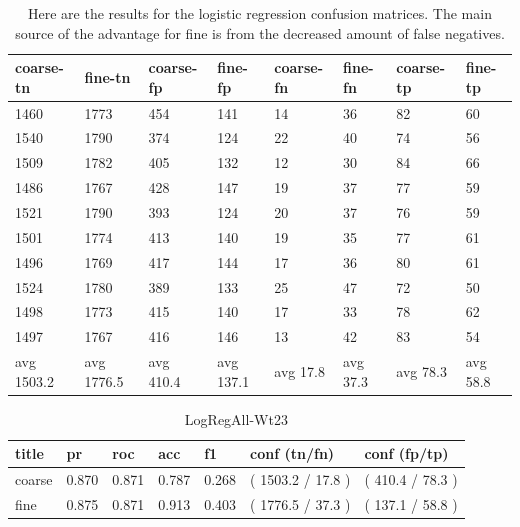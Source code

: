 \documentclass[ms]{nuthesis}
\begin{document}
\FloatBarrier
\begin{table}[H]
  \centering
  \begin{tabular}{|l||l||l||l||l||l||l||l|}\toprule
    coarse-tn & fine-tn & coarse-fp & fine-fp & coarse-fn & fine-fn & coarse-tp & fine-tp \\ \midrule
    1460 & 1773 & 454 & 141 & 14 & 36 & 82 & 60 \\
    1540 & 1790 & 374 & 124 & 22 & 40 & 74 & 56 \\
    1509 & 1782 & 405 & 132 & 12 & 30 & 84 & 66 \\
    1486 & 1767 & 428 & 147 & 19 & 37 & 77 & 59 \\
    1521 & 1790 & 393 & 124 & 20 & 37 & 76 & 59 \\
    1501 & 1774 & 413 & 140 & 19 & 35 & 77 & 61 \\
    1496 & 1769 & 417 & 144 & 17 & 36 & 80 & 61 \\
    1524 & 1780 & 389 & 133 & 25 & 47 & 72 & 50 \\
    1498 & 1773 & 415 & 140 & 17 & 33 & 78 & 62 \\
    1497 & 1767 & 416 & 146 & 13 & 42 & 83 & 54 \\
    avg 1503.2 & avg 1776.5 & avg 410.4 & avg 137.1 & avg 17.8 & avg 37.3 & avg 78.3 & avg 58.8 \\ \bottomrule
  \end{tabular}
  \caption{Here are the results for the logistic regression confusion matrices. The main source of the advantage
  for fine is from the decreased amount of false negatives.}
  \label{tab:logReg}
\end{table}
\FloatBarrier

\FloatBarrier
\begin{table}[H]
\centering
\begin{tabular}{|l||l||l||l||l||l||l|}\toprule
title & pr & roc & acc & f1 & conf (tn/fn) & conf (fp/tp) \\ \midrule
coarse & 0.870 & 0.871 & 0.787 & 0.268 & ( 1503.2 / 17.8 ) & ( 410.4 / 78.3 ) \\
fine & 0.875 & 0.871 & 0.913 & 0.403 & ( 1776.5 / 37.3 ) & ( 137.1 / 58.8 ) \\ \bottomrule
\end{tabular}
\caption{LogRegAll-Wt23}
\label{tab:LogRegAll-Wt23}
\end{table}
\FloatBarrier
\end{document}
